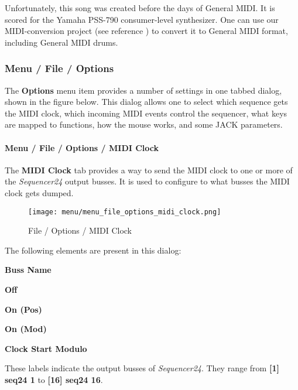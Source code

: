    Unfortunately, this song was created before the days of General MIDI.
   It is scored for the Yamaha PSS-790 consumer-level synthesizer.
   One can use our MIDI-conversion project (see reference \cite{midicvt}) 
   to convert it to General MIDI format, including General MIDI drums.

\subsubsection{Menu / File / Options}
\label{subsubsec:seq24_menu_file_options}

   The \textbf{Options} menu item provides a number of settings in one
   tabbed dialog, shown in the figure below.
   This dialog allows one to select which sequence gets the MIDI
   clock, which incoming MIDI events control the sequencer, what keys are
   mapped to functions, how the mouse works, and some JACK parameters.

\paragraph{Menu / File / Options / MIDI Clock}
\label{paragraph:seq24_menu_file_options_midi_clock}

   The \textbf{MIDI Clock} tab provides a way to send the MIDI clock to one
   or more of the \textsl{Sequencer24} output busses.
   It is used to configure to what busses the MIDI clock gets dumped.

\begin{figure}[H]
   \centering 
   \texttt{[image: menu/menu\_file\_options\_midi\_clock.png]}
   \caption{File / Options / MIDI Clock}
   \label{fig:seq24_menu_file_options_midi_clock}
\end{figure}

   The following elements are present in this dialog:

   \begin{enumber}
      \item \textbf{Buss Name}
      \item \textbf{Off}
      \item \textbf{On (Pos)}
      \item \textbf{On (Mod)}
      \item \textbf{Clock Start Modulo}
   \end{enumber}

   \setcounter{ItemCounter}{0}      %

   These labels indicate the output busses of \textsl{Sequencer24}.
   They range from \textbf{[1] seq24 1}
   to \textbf{[16] seq24 16}.

